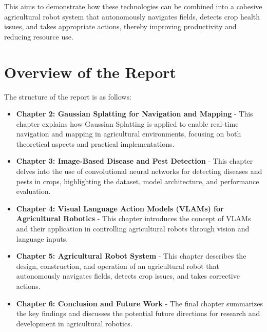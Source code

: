 This aims to demonstrate how these technologies can be combined into a cohesive agricultural robot system that autonomously navigates fields, detects crop health issues, and takes appropriate actions, thereby improving productivity and reducing resource use.\cite{sitokonstantinou2024causalmachinelearningsustainable}


\section{Overview of the Report}
The structure of the report is as follows:
\begin{itemize}
    \item \textbf{Chapter 2: Gaussian Splatting for Navigation and Mapping} - This chapter explains how Gaussian Splatting is applied to enable real-time navigation and mapping in agricultural environments, focusing on both theoretical aspects and practical implementations.
    \item \textbf{Chapter 3: Image-Based Disease and Pest Detection} - This chapter delves into the use of convolutional neural networks for detecting diseases and pests in crops, highlighting the dataset, model architecture, and performance evaluation.
    \item \textbf{Chapter 4: Visual Language Action Models (VLAMs) for Agricultural Robotics} - This chapter introduces the concept of VLAMs and their application in controlling agricultural robots through vision and language inputs.
    \item \textbf{Chapter 5: Agricultural Robot System} - This chapter describes the design, construction, and operation of an agricultural robot that autonomously navigates fields, detects crop issues, and takes corrective actions.
    \item \textbf{Chapter 6: Conclusion and Future Work} - The final chapter summarizes the key findings and discusses the potential future directions for research and development in agricultural robotics.
\end{itemize}



